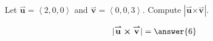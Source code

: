 \documentclass{ximera}
\author{Gregory Hartman \and Matthew Carr}
\begin{document}
\begin{exercise}

Let $\overset{\boldsymbol{\rightharpoonup}}{\mathbf{u}}= \left< 2,0,0 \right>$ and $\overset{\boldsymbol{\rightharpoonup}}{\mathbf{v}}= \left< 0,0,3 \right>$. Compute $|\overset{\boldsymbol{\rightharpoonup}}{\mathbf{u}} \boldsymbol\times \overset{\boldsymbol{\rightharpoonup}}{\mathbf{v}}|$.

\begin{prompt}
\[
|\overset{\boldsymbol{\rightharpoonup}}{\mathbf{u}} \boldsymbol\times \overset{\boldsymbol{\rightharpoonup}}{\mathbf{v}}|=\answer{6}
\]
\end{prompt}


\end{exercise}
\end{document}
